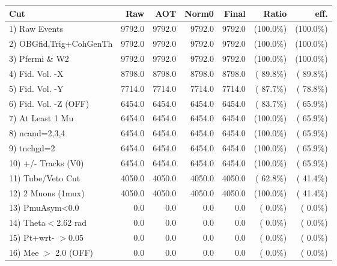  \begin{table}[h!]\centering
 \begin{tabular}{||l||r|r|r|r|r|r||}
 \hline
 \hline
 Cut & Raw & AOT & Norm0 & Final & Ratio & eff.       \\
 \hline
  1) Raw Events           &       9792.0 &       9792.0 &       9792.0 &       9792.0 & (100.0\%) & (100.0\%) \\
  2) OBGfid,Trig+CohGenTh &       9792.0 &       9792.0 &       9792.0 &       9792.0 & (100.0\%) & (100.0\%) \\
  3) Pfermi \& W2         &       9792.0 &       9792.0 &       9792.0 &       9792.0 & (100.0\%) & (100.0\%) \\
  4) Fid. Vol. -X         &       8798.0 &       8798.0 &       8798.0 &       8798.0 & ( 89.8\%) & ( 89.8\%) \\
  5) Fid. Vol. -Y         &       7714.0 &       7714.0 &       7714.0 &       7714.0 & ( 87.7\%) & ( 78.8\%) \\
  6) Fid. Vol. -Z (OFF)   &       6454.0 &       6454.0 &       6454.0 &       6454.0 & ( 83.7\%) & ( 65.9\%) \\
  7) At Least 1 Mu        &       6454.0 &       6454.0 &       6454.0 &       6454.0 & (100.0\%) & ( 65.9\%) \\
  8) ncand=2,3,4          &       6454.0 &       6454.0 &       6454.0 &       6454.0 & (100.0\%) & ( 65.9\%) \\
  9) tnchgd=2             &       6454.0 &       6454.0 &       6454.0 &       6454.0 & (100.0\%) & ( 65.9\%) \\
 10) +/- Tracks (V0)      &       6454.0 &       6454.0 &       6454.0 &       6454.0 & (100.0\%) & ( 65.9\%) \\
 11) Tube/Veto Cut        &       4050.0 &       4050.0 &       4050.0 &       4050.0 & ( 62.8\%) & ( 41.4\%) \\
 12) 2 Muons (1mux)       &       4050.0 &       4050.0 &       4050.0 &       4050.0 & (100.0\%) & ( 41.4\%) \\
 13) PmuAsym<0.0          &          0.0 &          0.0 &          0.0 &          0.0 & (  0.0\%) & (  0.0\%) \\
 14) Theta$<$2.62 rad     &          0.0 &          0.0 &          0.0 &          0.0 & (  0.0\%) & (  0.0\%) \\
 15) Pt+wrt- $>$0.05      &          0.0 &          0.0 &          0.0 &          0.0 & (  0.0\%) & (  0.0\%) \\
 16) Mee $>$ 2.0  (OFF)   &          0.0 &          0.0 &          0.0 &          0.0 & (  0.0\%) & (  0.0\%) \\

\end{tabular}
\end{table}
